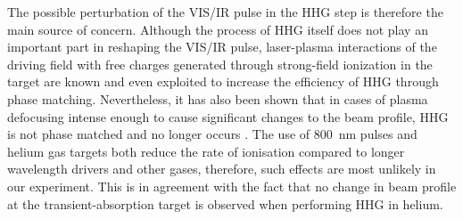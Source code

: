 \documentclass[12pt]{article}
\begin{document}
The possible perturbation of the VIS/IR pulse in the HHG step is therefore the main source of concern. Although the process of HHG itself does not play an important part in reshaping the VIS/IR pulse, laser-plasma interactions of the driving field with free charges generated through strong-field ionization in the target are known and even exploited to increase the efficiency of HHG through phase matching. Nevertheless, it has also been shown that in cases of plasma defocusing intense enough to cause significant changes to the beam profile, HHG is not phase matched and no longer occurs \cite{Lai2011}. The use of 800~nm pulses and helium gas targets both reduce the rate of ionisation compared to longer wavelength drivers and other gases, therefore, such effects are most unlikely in our experiment. This is in agreement with the fact that no change in beam profile at the transient-absorption target is observed when performing HHG in helium.
\end{document}
